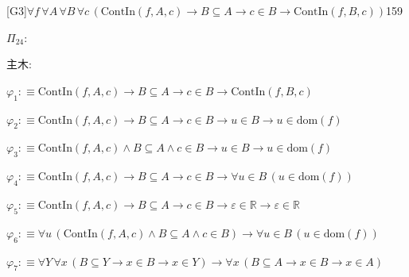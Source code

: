 \begin{fullproof}{[G3]}{$\forall f\,\forall A\,\forall B\,\forall c\,(\mathrm{ContIn}(f,A,c) \to B \subseteq A \to c \in B \to \mathrm{ContIn}(f,B,c))$}{159}
\begin{ptree}
\noLine
{}
\end{ptree}
\noindent$\Pi_{24}$:
\begin{ptree}
\noLine
{}
\noLine
{}
\end{ptree}
\noindent 主木:
\begin{ptree}
\noLine
{}
\noLine
{}
\end{ptree}
\begin{abbrevlist}
\item $\varphi_{1} :\equiv \mathrm{ContIn}(f,A,c) \to B \subseteq A \to c \in B \to \mathrm{ContIn}(f,B,c)$
\item $\varphi_{2} :\equiv \mathrm{ContIn}(f,A,c) \to B \subseteq A \to c \in B \to u \in B \to u \in \mathrm{dom}(f)$
\item $\varphi_{3} :\equiv \mathrm{ContIn}(f,A,c) \land B \subseteq A \land c \in B \to u \in B \to u \in \mathrm{dom}(f)$
\item $\varphi_{4} :\equiv \mathrm{ContIn}(f,A,c) \to B \subseteq A \to c \in B \to \forall u \in B\,(u \in \mathrm{dom}(f))$
\item $\varphi_{5} :\equiv \mathrm{ContIn}(f,A,c) \to B \subseteq A \to c \in B \to \varepsilon \in \mathbb{R} \to \varepsilon \in \mathbb{R}$
\item $\varphi_{6} :\equiv \forall u\,(\mathrm{ContIn}(f,A,c) \land B \subseteq A \land c \in B) \to \forall u \in B\,(u \in \mathrm{dom}(f))$
\item $\varphi_{7} :\equiv \forall Y\,\forall x\,(B \subseteq Y \to x \in B \to x \in Y) \to \forall x\,(B \subseteq A \to x \in B \to x \in A)$

\end{abbrevlist}
\end{fullproof}
